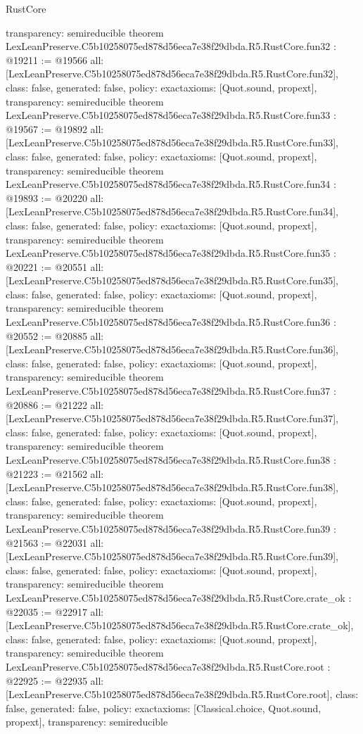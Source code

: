 \begin{lexlean}{RustCore}
\begin{coremodule}
{  transparency: semireducible
}
theorem LexLeanPreserve.C5b10258075ed878d56eca7e38f29dbda.R5.RustCore.fun32 : @19211 := @19566 {
  all: [LexLeanPreserve.C5b10258075ed878d56eca7e38f29dbda.R5.RustCore.fun32],
  class: false,
  generated: false,
  policy: exact{axioms: [Quot.sound, propext]},
  transparency: semireducible
}
theorem LexLeanPreserve.C5b10258075ed878d56eca7e38f29dbda.R5.RustCore.fun33 : @19567 := @19892 {
  all: [LexLeanPreserve.C5b10258075ed878d56eca7e38f29dbda.R5.RustCore.fun33],
  class: false,
  generated: false,
  policy: exact{axioms: [Quot.sound, propext]},
  transparency: semireducible
}
theorem LexLeanPreserve.C5b10258075ed878d56eca7e38f29dbda.R5.RustCore.fun34 : @19893 := @20220 {
  all: [LexLeanPreserve.C5b10258075ed878d56eca7e38f29dbda.R5.RustCore.fun34],
  class: false,
  generated: false,
  policy: exact{axioms: [Quot.sound, propext]},
  transparency: semireducible
}
theorem LexLeanPreserve.C5b10258075ed878d56eca7e38f29dbda.R5.RustCore.fun35 : @20221 := @20551 {
  all: [LexLeanPreserve.C5b10258075ed878d56eca7e38f29dbda.R5.RustCore.fun35],
  class: false,
  generated: false,
  policy: exact{axioms: [Quot.sound, propext]},
  transparency: semireducible
}
theorem LexLeanPreserve.C5b10258075ed878d56eca7e38f29dbda.R5.RustCore.fun36 : @20552 := @20885 {
  all: [LexLeanPreserve.C5b10258075ed878d56eca7e38f29dbda.R5.RustCore.fun36],
  class: false,
  generated: false,
  policy: exact{axioms: [Quot.sound, propext]},
  transparency: semireducible
}
theorem LexLeanPreserve.C5b10258075ed878d56eca7e38f29dbda.R5.RustCore.fun37 : @20886 := @21222 {
  all: [LexLeanPreserve.C5b10258075ed878d56eca7e38f29dbda.R5.RustCore.fun37],
  class: false,
  generated: false,
  policy: exact{axioms: [Quot.sound, propext]},
  transparency: semireducible
}
theorem LexLeanPreserve.C5b10258075ed878d56eca7e38f29dbda.R5.RustCore.fun38 : @21223 := @21562 {
  all: [LexLeanPreserve.C5b10258075ed878d56eca7e38f29dbda.R5.RustCore.fun38],
  class: false,
  generated: false,
  policy: exact{axioms: [Quot.sound, propext]},
  transparency: semireducible
}
theorem LexLeanPreserve.C5b10258075ed878d56eca7e38f29dbda.R5.RustCore.fun39 : @21563 := @22031 {
  all: [LexLeanPreserve.C5b10258075ed878d56eca7e38f29dbda.R5.RustCore.fun39],
  class: false,
  generated: false,
  policy: exact{axioms: [Quot.sound, propext]},
  transparency: semireducible
}
theorem LexLeanPreserve.C5b10258075ed878d56eca7e38f29dbda.R5.RustCore.crate_ok : @22035 := @22917 {
  all: [LexLeanPreserve.C5b10258075ed878d56eca7e38f29dbda.R5.RustCore.crate_ok],
  class: false,
  generated: false,
  policy: exact{axioms: [Quot.sound, propext]},
  transparency: semireducible
}
theorem LexLeanPreserve.C5b10258075ed878d56eca7e38f29dbda.R5.RustCore.root : @22925 := @22935 {
  all: [LexLeanPreserve.C5b10258075ed878d56eca7e38f29dbda.R5.RustCore.root],
  class: false,
  generated: false,
  policy: exact{axioms: [Classical.choice, Quot.sound, propext]},
  transparency: semireducible
}


\end{coremodule}
\end{lexlean}
